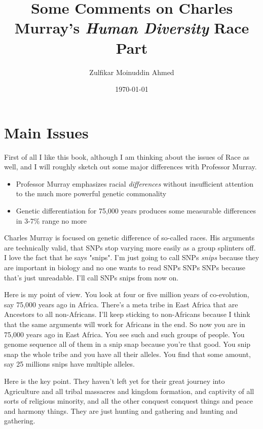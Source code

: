 \documentclass{amsart}
\title{Some Comments on Charles Murray's {\em Human Diversity} Race Part}
\author{Zulfikar Moinuddin Ahmed}
\date{\today}
\begin{document}
\maketitle

\section{Main Issues}

First of all I like this book, although I am thinking about the issues of Race as well, and I will roughly sketch out some major differences with Professor Murray.

\begin{itemize}
\item{Professor Murray emphasizes racial {\em differences} without insufficient attention to the much more powerful genetic commonality}

\item{Genetic differentiation for 75,000 years produces some measurable differences in 3-7\% range no more}
\end{itemize}

Charles Murray is focused on genetic difference of so-called races.  His arguments are technically valid, that SNPs stop varying more easily  as a group splinters off.  I love the fact that he says "snips".  I'm just going to call SNPs {\em snips} because they are important in biology and no one wants to read SNPs SNPs SNPs because that's just unreadable.  I'll call SNPs snips from now on. 

Here is my point of view. You look at four or five million years of co-evolution, say 75,000 years ago in Africa.  There's a meta tribe in East Africa that are Ancestors to all non-Africans.  I'll keep sticking to non-Africans because I think that the same arguments will work for Africans in the end.  So now you are in 75,000 years ago in East Africa.  You see such and such groups of people.  You genome sequence all of them in a snip snap because you're that good.  You snip snap the whole tribe and you have all their alleles.  You find that some amount, say 25 millions snips have multiple alleles.  

Here is the key point.  They haven't left yet for their great journey into Agriculture and all tribal massacres and kingdom formation, and captivity of all sorts of religious minority, and all the other conquest conquest things and peace and harmony things.  They are just hunting and gathering and hunting and gathering.  
\end{document}
